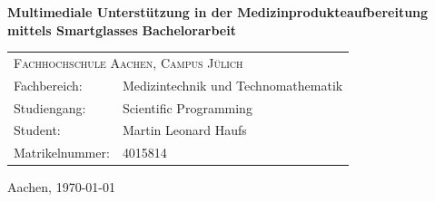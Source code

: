 \begin{titlepage}
	\begin{flushright}
		\textbf{\Large Multimediale Unterstützung in der Medizinprodukteaufbereitung mittels Smartglasses}
		\linebreak
		\linebreak
		\textbf{\Large Bachelorarbeit}
		\linebreak
		\linebreak
	\end{flushright}
	\vfill
	\begin{tabular*}{\linewidth}{ll}
	    \multicolumn{2}{l}{\textsc{Fachhochschule Aachen, Campus Jülich}}\\
		Fachbereich: & Medizintechnik und Technomathematik\\
		Studiengang: & Scientific Programming\\
		Student: & Martin Leonard Haufs\\ 
		Matrikelnummer: & 4015814
	\end{tabular*}
	\vfill	
	\centering\large Aachen, \today
\end{titlepage}